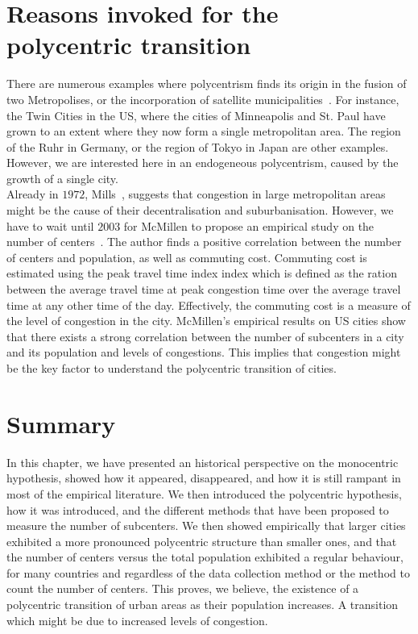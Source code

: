 \section{Reasons invoked for the polycentric transition}
\label{sec:reasons_invoked_for_the_polycentric_transition}

There are numerous examples where polycentrism finds its origin in the fusion of two
Metropolises, or the incorporation of satellite municipalities~\cite{LeNechet:2015}. For instance, the Twin Cities in the US, where the cities of
Minneapolis and St. Paul have grown to an extent where they now form a single
metropolitan area. The region of the Ruhr in Germany, or the region of Tokyo in
Japan are other examples. However, we are interested here in an endogeneous
polycentrism, caused by the growth of a single city.\\

Already in $1972$, Mills~\cite{Mills:1972}, suggests that congestion in large
metropolitan areas might be the cause of their decentralisation and
suburbanisation. However, we have to wait until $2003$ for McMillen to propose
an empirical study on the number of centers~\cite{McMillen:2003}. The author
finds a positive correlation between the number of centers and population, as
well as commuting cost. Commuting cost is estimated using the peak travel time
index index which is defined as the ration between the average travel time at
peak congestion time over the average travel time at any other time of the day.
Effectively, the commuting cost is a measure of the level of congestion in the
city. McMillen's empirical results on US cities show that there exists a strong
correlation between the number of subcenters in a city and its population and
levels of congestions. This implies that congestion might be the key factor to
understand the polycentric transition of cities.

\section{Summary}
\label{sec:summary}

In this chapter, we have presented an historical perspective on the monocentric
hypothesis, showed how it appeared, disappeared, and how it is still rampant in
most of the empirical literature. We then introduced the polycentric hypothesis,
how it was introduced, and the different methods that have been proposed to
measure the number of subcenters. We then showed empirically that larger cities exhibited a
more pronounced polycentric structure than smaller ones, and that the number of
centers versus the total population exhibited a regular behaviour, for many
countries and regardless of the data collection method or the method to count
the number of centers. This proves, we believe, the existence of a polycentric
transition of urban areas as their population increases. A transition which
might be due to increased levels of congestion.

